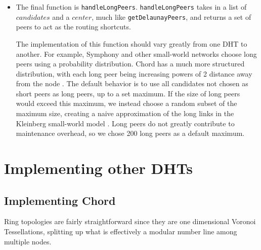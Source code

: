 \begin{itemize}



\item The final function is \texttt{handleLongPeers}.
\texttt{handleLongPeers} takes in a list of $ candidates $ and a $ center$, much like \texttt{getDelaunayPeers}, and returns a set of peers to act as the routing shortcuts.

The implementation of this function should vary greatly from one DHT to another.
For example, Symphony \cite{symphony} and other small-world networks \cite{kleinberg2000navigation} choose long peers using a probability distribution.
Chord has a much more structured distribution, with each long peer being increasing powers of 2 distance away from the node \cite{chord}.
The default behavior is to use all candidates not chosen as short peers as long peers, up to a set maximum.
If the size of long peers would exceed this maximum, we instead choose a random subset of the maximum size, creating a naive approximation of the long links in the Kleinberg small-world model \cite{kleinberg2000navigation}.
Long peers do not greatly contribute to maintenance overhead, so we chose 200 long peers as a default maximum.


\end{itemize}






\section{Implementing other DHTs}
\label{sec:implement}
\subsection{Implementing Chord}

Ring topologies are fairly straightforward since they are one dimensional Voronoi Tessellations, splitting up what is effectively a modular number line among multiple nodes.

